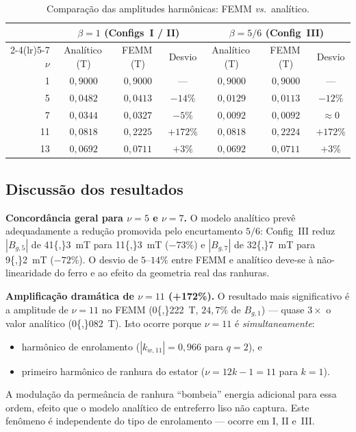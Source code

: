 \documentclass[12pt,a4paper]{article}
\begin{document}
\begin{table}[h!]
\centering\small
\caption{Comparação das amplitudes harmônicas: FEMM \textit{vs.}\ analítico.}
\label{tab:comp}
\setlength{\tabcolsep}{4pt}
\begin{tabular}{rcccccc}
\toprule
     & \multicolumn{3}{c}{$\beta{=}1$ (Configs~I / II)}
     & \multicolumn{3}{c}{$\beta{=}5/6$ (Config~III)}\\
\cmidrule(lr){2-4}\cmidrule(lr){5-7}
$\nu$ & Analítico\,(T) & FEMM\,(T) & Desvio
      & Analítico\,(T) & FEMM\,(T) & Desvio\\
\midrule
 1 & $0{,}9000$ & $0{,}9000$ & ---
   & $0{,}9000$ & $0{,}9000$ & ---\\
 5 & $0{,}0482$ & $0{,}0413$ & $-14\%$
   & $0{,}0129$ & $0{,}0113$ & $-12\%$\\
 7 & $0{,}0344$ & $0{,}0327$ & $-5\%$
   & $0{,}0092$ & $0{,}0092$ & ${\approx}0$\\
11 & $0{,}0818$ & $0{,}2225$ & $+172\%$
   & $0{,}0818$ & $0{,}2224$ & $+172\%$\\
13 & $0{,}0692$ & $0{,}0711$ & $+3\%$
   & $0{,}0692$ & $0{,}0711$ & $+3\%$\\
\bottomrule
\end{tabular}
\end{table}

\subsection*{Discussão dos resultados}

\textbf{Concordância geral para $\nu{=}5$ e $\nu{=}7$.}
O modelo analítico prevê adequadamente a redução promovida pelo encurtamento
$5/6$: Config~III reduz $|B_{g,5}|$ de \SI{41{,}3}{mT} para \SI{11{,}3}{mT}
($-73\%$) e $|B_{g,7}|$ de \SI{32{,}7}{mT} para \SI{9{,}2}{mT} ($-72\%$).
O desvio de $5$--$14\%$ entre FEMM e analítico deve-se à não-linearidade do
ferro e ao efeito da geometria real das ranhuras.

\textbf{Amplificação dramática de $\nu{=}11$ (+172\%).}
O resultado mais significativo é a amplitude de $\nu{=}11$ no FEMM
(\SI{0{,}222}{T}, $24{,}7\%$ de $B_{g,1}$) --- quase $3\times$ o valor
analítico (\SI{0{,}082}{T}).  Isto ocorre porque $\nu{=}11$ é
\emph{simultaneamente}:
\begin{itemize}[nosep,leftmargin=1.5em]
\item harmônico de enrolamento ($|k_{w,11}|{=}0{,}966$ para $q{=}2$), e
\item primeiro harmônico de ranhura do estator
      ($\nu{=}12k{-}1{=}11$ para $k{=}1$).
\end{itemize}
A modulação da permeância de ranhura ``bombeia'' energia adicional para essa
ordem, efeito que o modelo analítico de entreferro liso não captura.
Este fenômeno é independente do tipo de enrolamento --- ocorre em I, II e~III.
\end{document}
